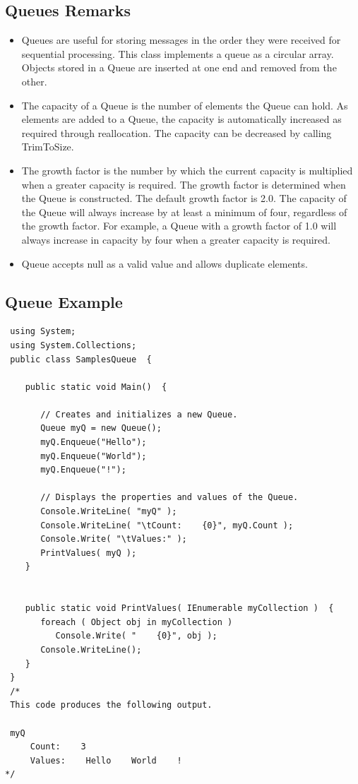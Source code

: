 \documentclass[12pt,a4paper,final,twoside,titlepage]{book}
\begin{document}
\subsection{Queues Remarks}
\begin{itemize}
\item Queues are useful for storing messages in the order they were received for sequential processing. This class implements a queue as a circular array. Objects stored in a Queue are inserted at one end and removed from the other.
\item The capacity of a Queue is the number of elements the Queue can hold. As elements are added to a Queue, the capacity is automatically increased as required through reallocation. The capacity can be decreased by calling TrimToSize.
\item The growth factor is the number by which the current capacity is multiplied when a greater capacity is required. The growth factor is determined when the Queue is constructed. The default growth factor is 2.0. The capacity of the Queue will always increase by at least a minimum of four, regardless of the growth factor. For example, a Queue with a growth factor of 1.0 will always increase in capacity by four when a greater capacity is required.
\item Queue accepts null as a valid value and allows duplicate elements.
\end{itemize}
\subsection{Queue Example}
\begin{lstlisting}
 using System;
 using System.Collections;
 public class SamplesQueue  {

    public static void Main()  {

       // Creates and initializes a new Queue.
       Queue myQ = new Queue();
       myQ.Enqueue("Hello");
       myQ.Enqueue("World");
       myQ.Enqueue("!");

       // Displays the properties and values of the Queue.
       Console.WriteLine( "myQ" );
       Console.WriteLine( "\tCount:    {0}", myQ.Count );
       Console.Write( "\tValues:" );
       PrintValues( myQ );
    }


    public static void PrintValues( IEnumerable myCollection )  {
       foreach ( Object obj in myCollection )
          Console.Write( "    {0}", obj );
       Console.WriteLine();
    }
 }
 /* 
 This code produces the following output.

 myQ
     Count:    3
     Values:    Hello    World    !
*/
\end{lstlisting}
\end{document}
